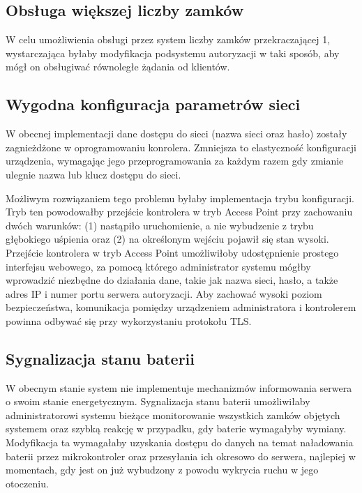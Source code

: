         \subsection{Obsługa większej liczby zamków}

            W celu umożliwienia obsługi przez system liczby zamków przekraczającej 1, wystarczająca byłaby modyfikacja podsystemu autoryzacji w taki sposób, aby mógł on obsługiwać równoległe żądania od klientów.

        \subsection{Wygodna konfiguracja parametrów sieci}

            W obecnej implementacji dane dostępu do sieci (nazwa sieci oraz hasło) zostały zagnieżdżone w oprogramowaniu konrolera. Zmniejsza to elastyczność konfiguracji urządzenia, wymagając jego przeprogramowania za każdym razem gdy zmianie ulegnie nazwa lub klucz dostępu do sieci.

            Możliwym rozwiązaniem tego problemu byłaby implementacja trybu konfiguracji. Tryb ten powodowałby przejście kontrolera w tryb Access Point przy zachowaniu dwóch warunków: (1) nastąpiło uruchomienie, a nie wybudzenie z trybu głębokiego uśpienia oraz (2) na określonym wejściu pojawił się stan wysoki. Przejście kontrolera w tryb Access Point umożliwiłoby udostępnienie prostego interfejsu webowego, za pomocą którego administrator systemu mógłby wprowadzić niezbędne do działania dane, takie jak nazwa sieci, hasło, a także adres IP i numer portu serwera autoryzacji. Aby zachować wysoki poziom bezpieczeństwa, komunikacja pomiędzy urządzeniem administratora i kontrolerem powinna odbywać się przy wykorzystaniu protokołu TLS.

        \subsection{Sygnalizacja stanu baterii}

            W obecnym stanie system nie implementuje mechanizmów informowania serwera o swoim stanie energetycznym.
            Sygnalizacja stanu baterii umożliwiłaby administratorowi systemu bieżące monitorowanie wszystkich zamków objętych systemem oraz szybką reakcję w przypadku, gdy baterie wymagałyby wymiany. Modyfikacja ta wymagałaby uzyskania dostępu do danych na temat naładowania baterii przez mikrokontroler oraz przesyłania ich okresowo do serwera, najlepiej w momentach, gdy jest on już wybudzony z powodu wykrycia ruchu w jego otoczeniu.

